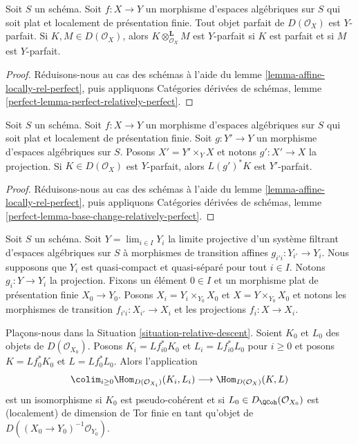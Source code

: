 \begin{lemma}
\label{lemma-perfect-relatively-perfect}
Soit $S$ un schéma.
Soit $f : X \to Y$ un morphisme d'espaces algébriques sur $S$
qui soit plat et localement de présentation finie.
Tout objet parfait de $D(\mathcal{O}_X)$ est $Y$-parfait.
Si $K, M \in D(\mathcal{O}_X)$, alors $K \otimes_{\mathcal{O}_X}^\mathbf{L} M$
est $Y$-parfait si $K$ est parfait et si $M$ est $Y$-parfait.
\end{lemma}

\begin{proof}
Réduisons-nous au cas des schémas à l'aide du
lemme \ref{lemma-affine-locally-rel-perfect},
puis appliquons
Catégories dérivées de schémas, lemme
\ref{perfect-lemma-perfect-relatively-perfect}.
\end{proof}

\begin{lemma}
\label{lemma-base-change-relatively-perfect}
Soit $S$ un schéma.
Soit $f : X \to Y$ un morphisme d'espaces algébriques sur $S$
qui soit plat et localement de présentation finie.
Soit $g : Y' \to Y$ un morphisme d'espaces algébriques sur $S$.
Posons $X' = Y' \times_Y X$ et notons $g' : X' \to X$ la projection.
Si $K \in D(\mathcal{O}_X)$ est $Y$-parfait, alors $L(g')^*K$
est $Y'$-parfait.
\end{lemma}

\begin{proof}
Réduisons-nous au cas des schémas à l'aide du
lemme \ref{lemma-affine-locally-rel-perfect},
puis appliquons
Catégories dérivées de schémas, lemme
\ref{perfect-lemma-base-change-relatively-perfect}.
\end{proof}

\begin{situation}
\label{situation-relative-descent}
Soit $S$ un schéma.
Soit $Y = \lim_{i \in I} Y_i$ la limite projective d'un système filtrant
d'espaces algébriques sur $S$
à morphismes de transition affines $g_{i'i} : Y_{i'} \to Y_i$.
Nous supposons que $Y_i$ est quasi-compact et quasi-séparé pour tout $i \in I$.
Notons $g_i : Y \to Y_i$ la projection. Fixons un élément $0 \in I$
et un morphisme plat de présentation finie $X_0 \to Y_0$.
Posons $X_i = Y_i \times_{Y_0} X_0$ et $X = Y \times_{Y_0} X_0$
et notons les morphismes de transition $f_{i'i} : X_{i'} \to X_i$
et les projections $f_i : X \to X_i$.
\end{situation}

\begin{lemma}
\label{lemma-relative-descend-homomorphisms}
Plaçons-nous dans la Situation \ref{situation-relative-descent}.
Soient $K_0$ et $L_0$ des objets de $D(\mathcal{O}_{X_0})$.
Posons $K_i = Lf_{i0}^*K_0$ et $L_i = Lf_{i0}^*L_0$ pour $i \geq 0$
et posons $K = Lf_0^*K_0$ et $L = Lf_0^*L_0$. Alors l'application
$$
\colim_{i \geq 0} \Hom_{D(\mathcal{O}_{X_i})}(K_i, L_i)
\longrightarrow
\Hom_{D(\mathcal{O}_X)}(K, L)
$$
est un isomorphisme si $K_0$ est pseudo-cohérent et si
$L_0 \in D_\QCoh(\mathcal{O}_{X_0})$ est (localement) de
dimension de Tor finie en tant qu'objet de
$D((X_0 \to Y_0)^{-1}\mathcal{O}_{Y_0})$.
\end{lemma}

